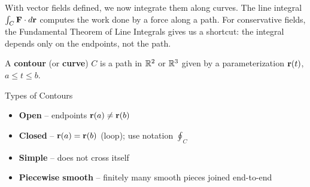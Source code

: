 \documentclass[11pt]{article}
\begin{document}

\begin{background}
With vector fields defined, we now integrate them along curves. The line integral $\int_C \mathbf{F}\cdot d\mathbf{r}$ computes the work done by a force along a path. For conservative fields, the Fundamental Theorem of Line Integrals gives us a shortcut: the integral depends only on the endpoints, not the path.
\end{background}


A \textbf{contour} (or \textbf{curve}) $C$ is a path in $\mathbb{R}^2$ or $\mathbb{R}^3$ given by a parameterization $\mathbf{r}(t)$, $a \le t \le b$.

\begin{defbox}{Types of Contours}
\begin{itemize}[nosep, leftmargin=*]
  \item \textbf{Open} -- endpoints $\mathbf{r}(a) \neq \mathbf{r}(b)$
  \item \textbf{Closed} -- $\mathbf{r}(a) = \mathbf{r}(b)$ (loop); use notation $\oint_C$
  \item \textbf{Simple} -- does not cross itself
  \item \textbf{Piecewise smooth} -- finitely many smooth pieces joined end-to-end
\end{itemize}
\end{defbox}
\end{document}
